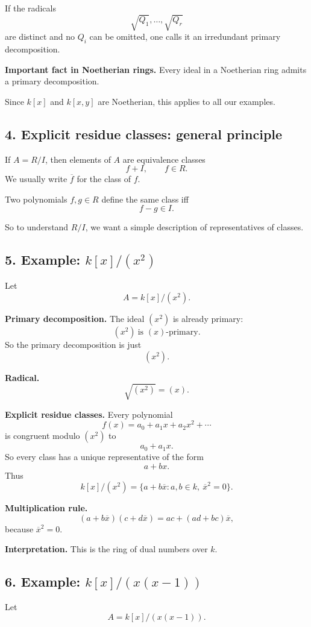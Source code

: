 \documentclass[12pt,a4paper]{article}
\theoremstyle{notespace}
\begin{document}
If the radicals
\[
\sqrt{Q_1},\dots,\sqrt{Q_r}
\]
are distinct and no \(Q_i\) can be omitted, one calls it an irredundant primary decomposition.

\textbf{Important fact in Noetherian rings.}
Every ideal in a Noetherian ring admits a primary decomposition.

Since \(k[x]\) and \(k[x,y]\) are Noetherian, this applies to all our examples.

\subsection*{4. Explicit residue classes: general principle}

If \(A=R/I\), then elements of \(A\) are equivalence classes
\[
f+I,\qquad f\in R.
\]
We usually write \(\overline f\) for the class of \(f\).

Two polynomials \(f,g\in R\) define the same class iff
\[
f-g\in I.
\]

So to understand \(R/I\), we want a simple description of representatives of classes.

\subsection*{5. Example: \(k[x]/(x^2)\)}

Let
\[
A=k[x]/(x^2).
\]

\textbf{Primary decomposition.}
The ideal \((x^2)\) is already primary:
\[
(x^2)\ \text{is }(x)\text{-primary}.
\]
So the primary decomposition is just
\[
(x^2).
\]

\textbf{Radical.}
\[
\sqrt{(x^2)}=(x).
\]

\textbf{Explicit residue classes.}
Every polynomial
\[
f(x)=a_0+a_1x+a_2x^2+\cdots
\]
is congruent modulo \((x^2)\) to
\[
a_0+a_1x.
\]
So every class has a unique representative of the form
\[
a+b x.
\]
Thus
\[
k[x]/(x^2)=\{a+b\overline x:a,b\in k,\ \overline x^2=0\}.
\]

\textbf{Multiplication rule.}
\[
(a+b\overline x)(c+d\overline x)=ac+(ad+bc)\overline x,
\]
because \(\overline x^2=0\).

\textbf{Interpretation.}
This is the ring of dual numbers over \(k\).

\subsection*{6. Example: \(k[x]/(x(x-1))\)}

Let
\[
A=k[x]/(x(x-1)).
\]
\end{document}
